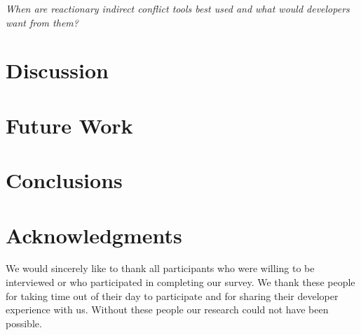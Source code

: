 \documentclass[conference]{IEEEtran}
\begin{document}
\begin{description}[topsep=6pt]
	\item[RQ8] \textit{When are reactionary indirect conflict tools best used and what would developers want from them?}
\end{description}

\section{Discussion}

\section{Future Work}

\section{Conclusions}

\section{Acknowledgments}

We would sincerely like to thank all participants who were willing to be interviewed or who participated
in completing our survey. We thank these people for taking time out of their day to participate and for
sharing their developer experience with us. Without these people our research could not have been possible.

%
%

\end{document}
